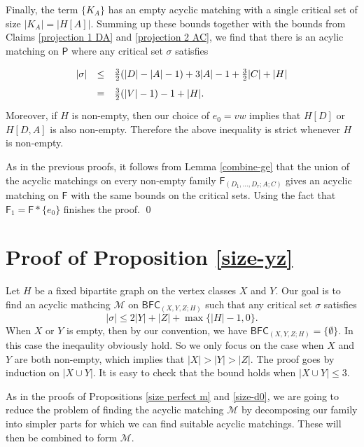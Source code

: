 \documentclass[10pt]{amsart}
\theoremstyle{definition}
\begin{document}
	Finally, the term $\{K_{A}\}$ has an empty acyclic matching with a  single critical set of size $|K_{A}| = |H[A]|$. Summing up these bounds together with the bounds from Claims \ref{projection 1 DA} and \ref{projection 2 AC}, we find that there is an acylic matching on $\mathsf{P}$ where any critical set $\sigma$ satisfies 
	\[\def\arraystretch{1.65}
	\begin{array}{rcl}
	|\sigma| & \leq & \textstyle{\frac{3}{2}}(|D|-|A|-1) +3|A|-1 +\textstyle{\frac{3}{2}}|C| + |H| \\
	& = & \textstyle{\frac{3}{2}}(|V|-1) -1 +|H|.
	\end{array}\]
	Moreover, if $H$ is non-empty, then our choice of $e_0=vw$ implies that $H[D]$ or $H[D,A]$ is also non-empty. Therefore the above inequality is strict whenever $H$ is non-empty. 
	
	As in the previous proofs, it follows from Lemma \ref{combine-ge} that the union of the acyclic matchings on every non-empty family $\mathsf{F}_{(D_1, \dots, D_r; A; C)}$ gives an acyclic matching on $\mathsf{F}$ with the same bounds on the critical sets. Using the fact that $\mathsf{F}_1 = \mathsf{F}*\{e_0\}$ finishes the proof. \qed
	
	
	
	\section{Proof of Proposition \ref{size-yz}} \label{section_size-yz}
	Let $H$ be a fixed bipartite graph on the vertex classes $X$ and $Y$. Our goal is to find an acyclic mathcing $\mathcal{M}$ on $\mathsf{BFC}_{(X, Y, Z; H)}$ such that any critical set $\sigma$ satisfies 
	\begin{equation} \label{BFC-bound}
	|\sigma| \leq 2|Y| + |Z| + \max\{|H|-1, 0\}.
	\end{equation}
	When $X$ or $Y$ is empty, then by our convention, we have $\mathsf{BFC}_{(X, Y, Z; H)}=\{\emptyset \}$. In this case the ineqaulity obviously hold. So we only focus on the case when $X$ and $Y$ are both non-empty, which implies that $|X|>|Y|>|Z|$. The proof goes by induction on $|X\cup Y|$. It is easy to check that the bound holds when $|X\cup Y|\leq 3$.
	
	As in the proofs of Propositions \ref{size perfect m} and \ref{size-d0}, we are going to reduce the problem of finding the acyclic matching $\mathcal{M}$ by decomposing our family into simpler parts for which we can find suitable acyclic matchings. These will then be combined to form $\mathcal{M}$. 
	
\end{document}
